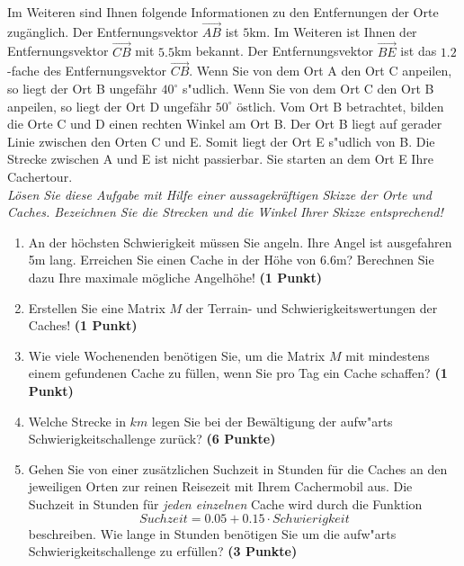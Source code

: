 \documentclass[a4paper, 10pt]{scrartcl}\usepackage[]{graphicx}\usepackage[]{xcolor}
\begin{document}
Im Weiteren sind Ihnen folgende Informationen zu den Entfernungen der Orte
zug{\"a}nglich. Der Entfernungsvektor $\overrightarrow{AB}$ ist
$5$km. Im Weiteren ist Ihnen der Entfernungsvektor
$\overrightarrow{CB}$ mit $5.5$km bekannt. Der
Entfernungsvektor $\overrightarrow{BE}$ ist das $1.2$-fache
des Entfernungsvektor $\overrightarrow{CB}$. Wenn Sie von dem Ort A den Ort
C anpeilen, so liegt der Ort B ungef{\"a}hr $40^\circ$
s{"u}dlich. Wenn Sie von dem Ort C den Ort B anpeilen, so liegt
der Ort D ungef{\"a}hr $50^\circ$ {\"o}stlich. Vom Ort B
betrachtet, bilden die Orte C und D einen rechten Winkel am Ort B. Der Ort
B liegt auf gerader Linie zwischen den Orten C und E. Somit liegt der Ort E
s{"u}dlich von B. Die Strecke zwischen A und E ist nicht
passierbar. Sie starten an dem Ort E Ihre Cachertour. \\

\textit{L{\"o}sen Sie diese Aufgabe mit Hilfe einer aussagekr{\"a}ftigen Skizze der
  Orte und Caches. Bezeichnen Sie die Strecken und die Winkel Ihrer Skizze
  entsprechend!}

\begin{enumerate}
\item An der h{\"o}chsten Schwierigkeit m{\"u}ssen Sie angeln. Ihre Angel ist
  ausgefahren 5m lang. Erreichen Sie einen Cache in der H{\"o}he
  von 6.6m?  Berechnen Sie dazu Ihre maximale m{\"o}gliche
  Angelh{\"o}he! \textbf{(1 Punkt)}
\item Erstellen Sie eine Matrix $M$ der Terrain- und Schwierigkeitswertungen
  der Caches! \textbf{(1 Punkt)}  
\item Wie viele Wochenenden ben{\"o}tigen Sie, um die Matrix $M$ mit mindestens
  einem gefundenen Cache zu f{\"u}llen, wenn Sie
  pro Tag ein Cache schaffen? \textbf{(1 Punkt)} 
\item Welche Strecke in $km$ legen Sie bei der Bew{\"a}ltigung der
  aufw{"a}rts Schwierigkeitschallenge zur{\"u}ck? \textbf{(6
    Punkte)}
\item Gehen Sie von einer zus{\"a}tzlichen Suchzeit in Stunden f{\"u}r die
  Caches an den jeweiligen Orten zur reinen Reisezeit mit Ihrem Cachermobil
  aus. Die Suchzeit in Stunden f{\"u}r \textit{jeden einzelnen} Cache wird durch die
  Funktion
  \begin{equation*}
    Suchzeit = 0.05 + 0.15 \cdot Schwierigkeit
  \end{equation*}  
  beschreiben.  Wie lange in Stunden ben{\"o}tigen Sie um die
  aufw{"a}rts Schwierigkeitschallenge zu erf{\"u}llen? \textbf{(3 Punkte)} 
\end{enumerate}
\end{document}
